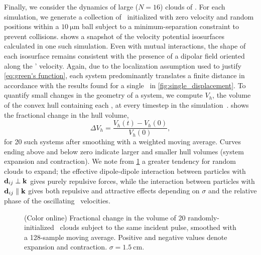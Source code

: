 Finally, we consider the dynamics of large ($N=16$) clouds of \bubbles.
For each simulation, we generate a collection of \bubbles\ initialized with zero velocity and random positions within a $\SI{10}{\micro\meter}$ ball subject to a minimum-separation constraint to prevent collisions.
 shows a snapshot of the velocity potential isosurfaces calculated in one such simulation. Even with mutual interactions, the shape of each isosurface remains consistent with the presence of a dipolar field oriented along the \bubbles' velocity.
Again, due to the localization assumption used to justify \cref{eq:green's function}, each system predominantly translates a finite distance in accordance with the results found for a single \bubble\ in \cref{fig:single_displacement}.
To quantify small changes in the geometry of a system, we compute $V_h$, the volume of the convex hull containing each \bubble, at every timestep in the simulation~\cite{SciPy}.
 shows the fractional change in the hull volume,
\begin{equation}
  \Delta V_h = \frac{V_h(t) - V_h(0)}{V_h(0)},
\end{equation}
for 20 such systems after smoothing with a weighted moving average.
Curves ending above and below zero indicate larger and smaller hull volumes (system expansion and contraction).
We note from \cref{fig:hull change} a greater tendency for random clouds to expand; the effective dipole-dipole interaction between particles with $\vb{d}_{ij} \perp \vb{k}$ gives purely repulsive forces, while the interaction between particles with $\vb{d}_{ij} \parallel \vb{k}$ gives both repulsive and attractive effects depending on $\sigma$ and the relative phase of the oscillating \bubble\ velocities.

\begin{figure}
  \centering
  \caption{\label{fig:hull change}(Color online)
    Fractional change in the volume of 20 randomly-initialized \bubble\ clouds subject to the same incident pulse, smoothed with a 128-sample moving average.
    Positive and negative values denote expansion and contraction. $\sigma = \SI{1.5}{\centi\meter}$.
  }
\end{figure}
